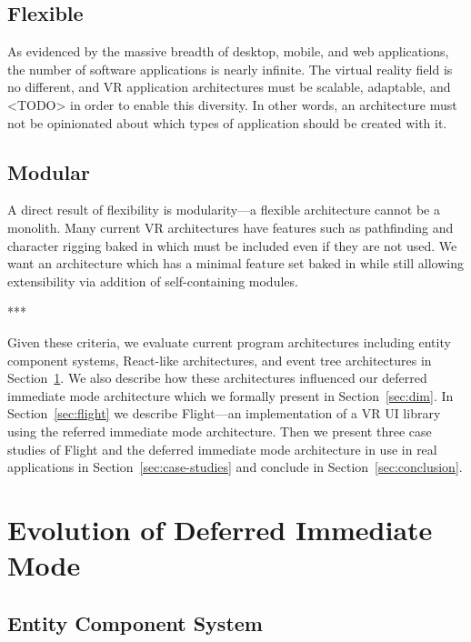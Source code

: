 \documentclass[conference,12pt]{IEEEtran}
\begin{document}
\subsection{Flexible}
As evidenced by the massive breadth of desktop, mobile, and web applications,
the number of software applications is nearly infinite. The virtual reality
field is no different, and VR application architectures must be scalable,
adaptable, and <TODO> in order to enable this diversity. In other words, an
architecture must not be opinionated about which types of application should be
created with it. %

\subsection{Modular}
A direct result of flexibility is modularity---a flexible architecture cannot be
a monolith. Many current VR architectures have features such as pathfinding and
character rigging baked in which must be included even if they are not used. We
want an architecture which has a minimal feature set baked in while still
allowing extensibility via addition of self-containing modules.

\begin{center}***\end{center}

Given these criteria, we evaluate current program architectures including entity
component systems, React-like architectures, and event tree architectures in
Section~\ref{sec:evolution}. We also describe how these architectures influenced
our deferred immediate mode architecture which we formally present in
Section~\ref{sec:dim}. In Section~\ref{sec:flight} we describe Flight---an
implementation of a VR UI library using the referred immediate mode
architecture. Then we present three case studies of Flight and the deferred
immediate mode architecture in use in real applications in
Section~\ref{sec:case-studies} and conclude in Section~\ref{sec:conclusion}.

\section{Evolution of Deferred Immediate Mode}\label{sec:evolution}

\subsection{Entity Component System}
\end{document}
